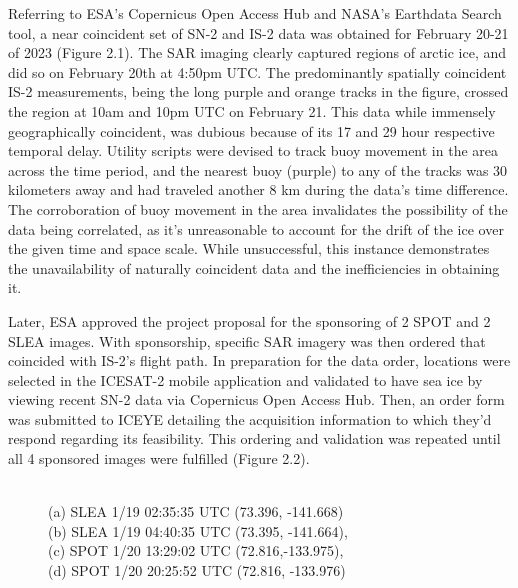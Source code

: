 Referring to ESA's Copernicus Open Access Hub and NASA's Earthdata Search tool, a near coincident set of SN-2 and IS-2 data was obtained for February 20-21 of 2023 (Figure 2.1). The SAR imaging clearly captured regions of arctic ice, and did so on February 20th at 4:50pm UTC. The predominantly spatially coincident IS-2 measurements, being the long purple and orange tracks in the figure, crossed the region at 10am and 10pm UTC on February 21. This data while immensely geographically coincident, was dubious because of its 17 and 29 hour respective temporal delay. Utility scripts were devised to track buoy movement in the area across the time period, and the nearest buoy (purple) to any of the tracks was 30 kilometers away and had traveled another 8 km during the data's time difference. The corroboration of buoy movement in the area invalidates the possibility of the data being correlated, as it's unreasonable to account for the drift of the ice over the given time and space scale. While unsuccessful, this instance demonstrates the unavailability of naturally coincident data and the inefficiencies in obtaining it.

Later, ESA approved the project proposal for the sponsoring of 2 SPOT and 2 SLEA images. With sponsorship, specific SAR imagery was then ordered that coincided with IS-2's flight path. In preparation for the data order, locations were selected in the ICESAT-2 mobile application and validated to have sea ice by viewing recent SN-2 data via Copernicus Open Access Hub. Then, an order form was submitted to ICEYE detailing the acquisition information to which they'd respond regarding its feasibility. This ordering and validation was repeated until all 4 sponsored images were fulfilled (Figure 2.2).

\begin{figure}[h!]
    \centering
    \caption[ICEYE Captured SAR Imagery]{
    \\\hspace{\textwidth}
    (a) SLEA 1/19 02:35:35 UTC (73.396, -141.668)\\\hspace{\textwidth}
     (b) SLEA 1/19 04:40:35 UTC (73.395, -141.664),\\\hspace{\textwidth}
      (c) SPOT 1/20 13:29:02 UTC (72.816,-133.975),\\\hspace{\textwidth}
      (d) SPOT 1/20 20:25:52 UTC (72.816, -133.976)
      }
    \label{gathered-sar}

\end{figure}


